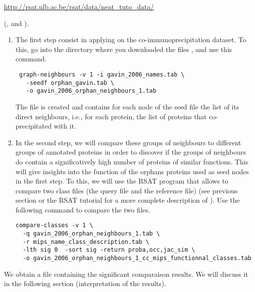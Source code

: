\url{http://rsat.ulb.ac.be/rsat/data/neat\_tuto\_data/}

(,  and
).

\begin{enumerate}

\item The first step consist in applying  on
  the co-immunoprecipitation dataset. To this, go into the directory
  where you downloaded the files ,
   and use this command.
	
\begin{lstlisting}
 graph-neighbours -v 1 -i gavin_2006_names.tab \ 
   -seedf orphan_gavin.tab \
   -o gavin_2006_orphan_neighbours_1.tab
\end{lstlisting}

The file  is created and
contains for each node of the seed file the list of its direct
neighbours, i.e., for each protein, the list of proteins that
co-precipitated with it.

\item In the second step, we will compare these groups of neighbours
  to different groups of annotated proteins in order to discover if
  the groups of neighbours do contain a significatively high number of
  proteins of similar functions. This will give insights into the
  function of the orphans proteins used as seed nodes in the first
  step. To this, we will use the RSAT 
  program that allows to compare two class files (the query file and
  the reference file) (see previous section or the RSAT tutorial for a
  more complete description of \program{compare-classes}). Use the
  following command to compare the two files.
	
\begin{nobreak}
\begin{lstlisting}
compare-classes -v 1 \
  -q gavin_2006_orphan_neighbours_1.tab \
  -r mips_name_class_description.tab \
  -lth sig 0  -sort sig -return proba,occ,jac_sim \
  -o gavin_2006_orphan_neighbours_1_cc_mips_functionnal_classes.tab
\end{lstlisting}
\end{nobreak}

\end{enumerate}

We obtain a file
containing the significant comparaison results. We will discuss it in
the following section (interpretation of the results).

